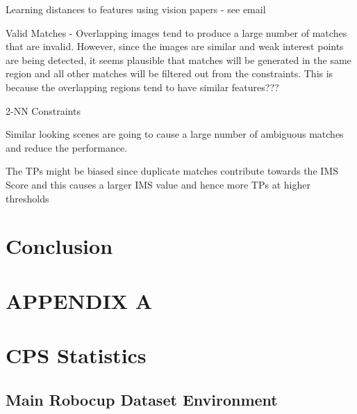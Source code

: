 \documentclass[11pt]{report}
\begin{document}
Learning distances to features using vision papers - see email

Valid Matches - Overlapping images tend to produce a large number of matches that are invalid. However, since the images are similar and weak interest points are being detected, it seems plausible that matches will be generated in the same region and all other matches will be filtered out from the constraints. This is because the overlapping regions tend to have similar features???

2-NN Constraints

Similar looking scenes are going to cause a large number of ambiguous matches and reduce the performance.

The TPs might be biased since duplicate matches contribute towards the IMS Score and this causes a larger IMS value and hence more TPs at higher thresholds

\section{Conclusion}
\label{sec:conclusion}



 \newpage
\onecolumn
\appendix
\setcounter{table}{0}
\setcounter{figure}{0}
\setcounter{subsection}{0}
\makeatletter \renewcommand{\thefigure}{A.\@arabic\c@figure} \renewcommand{\thetable}{A.\@arabic\c@table} \renewcommand{\thesection}{A.\@arabic\c@section} \makeatother
\section*{APPENDIX A}

\section{CPS Statistics}
\label{app:cps}

\subsection{Main Robocup Dataset Environment}
\label{app:mrd}
\end{document}
